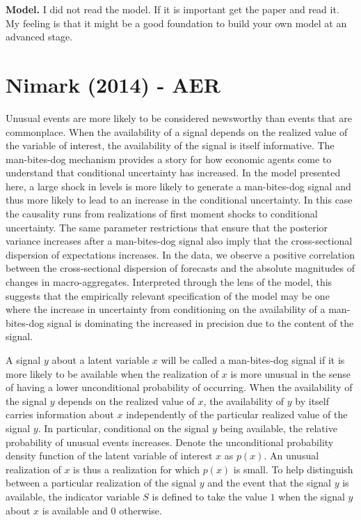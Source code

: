 \documentclass{article}
\begin{document}
{\textbf{Model.} I did not read the model. If it is important get the paper and read it. My feeling is that it might be a good foundation to build your own model at an advanced stage. 

\section{Nimark (2014) - AER}

Unusual events are more likely to be considered newsworthy than events that are commonplace. When the availability of a signal depends on the realized value of the variable of interest, the availability of the signal is itself informative. The man-bites-dog mechanism provides a story for how economic agents come to understand that conditional uncertainty has increased. In the model presented here, a large shock in levels is more likely to generate a man-bites-dog signal and thus more likely to lead to an increase in the conditional uncertainty. In this case the causality runs from realizations of first moment shocks to conditional uncertainty. The same parameter restrictions that ensure that the posterior variance increases after a man-bites-dog signal also imply that the cross-sectional dispersion of expectations increases. In the data, we observe a positive correlation between the cross-sectional dispersion of forecasts and the absolute magnitudes of changes in macro-aggregates. Interpreted through the lens of the model, this suggests that the empirically relevant specification of the model may be one where the increase in uncertainty from conditioning on the availability of a man-bites-dog signal is dominating the increased in precision due to the content of the signal.

A signal $y$ about a latent variable $x$ will be called a man-bites-dog signal if it is more likely to be available when the realization of $x$ is more unusual in the sense of having a lower unconditional probability of occurring. When the availability of the signal $y$ depends on the realized value of $x$, the availability of $y$ by itself carries information about $x$ independently of the particular realized value of the signal $y$. In particular, conditional on the signal $y$ being available, the relative probability of unusual events increases. Denote the unconditional probability density function of the latent variable of interest $x$ as $p(x)$. An unusual realization of $x$ is thus a realization for which $p(x)$ is small. To help distinguish between a particular realization of the signal $y$ and the event that the signal $y$ is available, the indicator variable $S$ is defined to take the value $1$ when the signal $y$ about $x$ is available and $0$ otherwise. 

}
\end{document}
